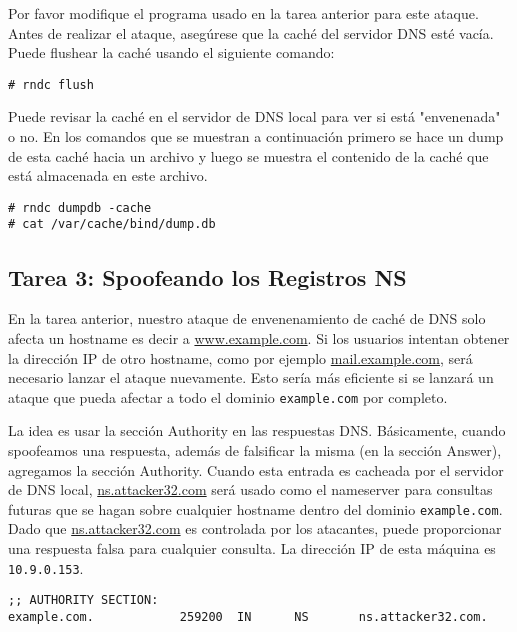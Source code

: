 Por favor modifique el programa usado en la tarea anterior para este ataque.
Antes de realizar el ataque, asegúrese que la caché del servidor DNS esté vacía.
Puede flushear la caché usando el siguiente comando:

\begin{lstlisting}
# rndc flush
\end{lstlisting}

Puede revisar la caché en el servidor de DNS local para ver si está "envenenada" o no. En los comandos que se muestran a continuación primero se hace un dump de esta caché hacia un archivo y luego se muestra el contenido de la caché que está almacenada en este archivo.

\begin{lstlisting}
# rndc dumpdb -cache
# cat /var/cache/bind/dump.db
\end{lstlisting}



\subsection{Tarea 3: Spoofeando los Registros NS}

En la tarea anterior, nuestro ataque de envenenamiento de caché de DNS solo afecta
un hostname es decir a \url{www.example.com}. Si los usuarios intentan obtener la dirección IP de otro hostname, como por ejemplo \url{mail.example.com}, será necesario lanzar el ataque nuevamente. Esto sería más eficiente si se lanzará un ataque que pueda afectar a todo el dominio \texttt{example.com} por completo.

La idea es usar la sección Authority en las respuestas DNS.
Básicamente, cuando spoofeamos una respuesta, además de falsificar la misma (en la sección Answer), agregamos la sección Authority.
Cuando esta entrada es cacheada por el servidor de DNS local, \url{ns.attacker32.com} será usado como el nameserver para consultas futuras que se hagan sobre cualquier hostname dentro del dominio \texttt{example.com}. Dado que \url{ns.attacker32.com} es controlada por los atacantes, puede proporcionar una respuesta falsa para cualquier consulta. La dirección IP de esta máquina es \texttt{10.9.0.153}.

\begin{lstlisting}
;; AUTHORITY SECTION:
example.com.            259200  IN      NS       ns.attacker32.com.
\end{lstlisting}
 
